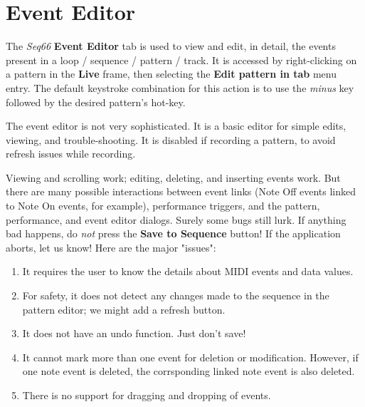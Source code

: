 %
%

\section{Event Editor}
\label{sec:event_editor}

   The \textsl{Seq66} \textbf{Event Editor} tab is used to view and edit,
   in detail, the events present in a loop / sequence / pattern / track.
   It is accessed by right-clicking on a pattern in the \textbf{Live} frame,
   then selecting the \textbf{Edit pattern in tab} menu entry.
   The default keystroke combination for this action is to use the
   \textsl{minus} key followed by the desired pattern's hot-key.

   The event editor is not very sophisticated.
   It is a basic editor for simple edits, viewing, and trouble-shooting.
   It is disabled if recording a pattern, to avoid refresh issues while
   recording.

   Viewing and scrolling work;
   editing, deleting, and inserting events work.
   But there are many possible interactions between event links
   (Note Off events linked to Note On events, for example),
   performance triggers, and the pattern,
   performance, and event editor dialogs.
   Surely some bugs still lurk.
   If anything bad happens, do \textsl{not} press the
   \textbf{Save to Sequence} button!
   If the application aborts, let us know!
   Here are the major "issues":

   \begin{enumerate}
      \item It requires the user to know the details
         about MIDI events and data values.
      \item For safety, it does not detect any changes made to the sequence in
         the pattern editor; we might add a refresh button.
      \item It does not have an undo function. Just don't save!
      \item It cannot mark more than one event for deletion or modification.
         However, if one note event is deleted, the corrsponding linked note
         event is also deleted.
      \item There is no support for dragging and dropping of events.
   \end{enumerate}

